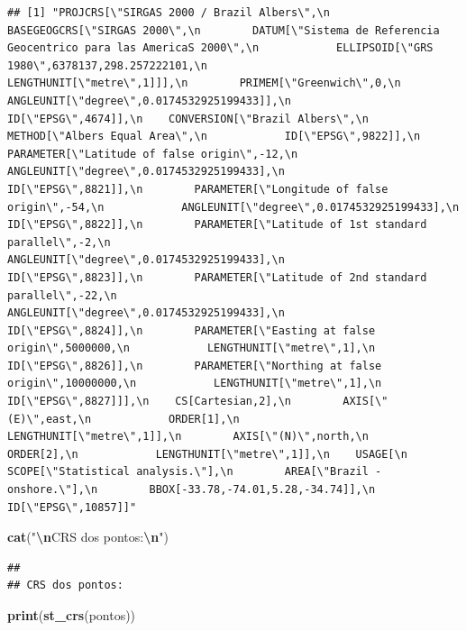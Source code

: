 \documentclass[
]{article}
\newenvironment{Shaded}{\begin{snugshade}}{\end{snugshade}}
\newcommand{\FunctionTok}[1]{\textcolor[rgb]{0.13,0.29,0.53}{\textbf{#1}}}
\newcommand{\NormalTok}[1]{#1}
\newcommand{\SpecialCharTok}[1]{\textcolor[rgb]{0.81,0.36,0.00}{\textbf{#1}}}
\newcommand{\StringTok}[1]{\textcolor[rgb]{0.31,0.60,0.02}{#1}}
\begin{document}
\begin{verbatim}
## [1] "PROJCRS[\"SIRGAS 2000 / Brazil Albers\",\n    BASEGEOGCRS[\"SIRGAS 2000\",\n        DATUM[\"Sistema de Referencia Geocentrico para las AmericaS 2000\",\n            ELLIPSOID[\"GRS 1980\",6378137,298.257222101,\n                LENGTHUNIT[\"metre\",1]]],\n        PRIMEM[\"Greenwich\",0,\n            ANGLEUNIT[\"degree\",0.0174532925199433]],\n        ID[\"EPSG\",4674]],\n    CONVERSION[\"Brazil Albers\",\n        METHOD[\"Albers Equal Area\",\n            ID[\"EPSG\",9822]],\n        PARAMETER[\"Latitude of false origin\",-12,\n            ANGLEUNIT[\"degree\",0.0174532925199433],\n            ID[\"EPSG\",8821]],\n        PARAMETER[\"Longitude of false origin\",-54,\n            ANGLEUNIT[\"degree\",0.0174532925199433],\n            ID[\"EPSG\",8822]],\n        PARAMETER[\"Latitude of 1st standard parallel\",-2,\n            ANGLEUNIT[\"degree\",0.0174532925199433],\n            ID[\"EPSG\",8823]],\n        PARAMETER[\"Latitude of 2nd standard parallel\",-22,\n            ANGLEUNIT[\"degree\",0.0174532925199433],\n            ID[\"EPSG\",8824]],\n        PARAMETER[\"Easting at false origin\",5000000,\n            LENGTHUNIT[\"metre\",1],\n            ID[\"EPSG\",8826]],\n        PARAMETER[\"Northing at false origin\",10000000,\n            LENGTHUNIT[\"metre\",1],\n            ID[\"EPSG\",8827]]],\n    CS[Cartesian,2],\n        AXIS[\"(E)\",east,\n            ORDER[1],\n            LENGTHUNIT[\"metre\",1]],\n        AXIS[\"(N)\",north,\n            ORDER[2],\n            LENGTHUNIT[\"metre\",1]],\n    USAGE[\n        SCOPE[\"Statistical analysis.\"],\n        AREA[\"Brazil - onshore.\"],\n        BBOX[-33.78,-74.01,5.28,-34.74]],\n    ID[\"EPSG\",10857]]"
\end{verbatim}

\begin{Shaded}
\begin{Highlighting}[]
\FunctionTok{cat}\NormalTok{(}\StringTok{"}\SpecialCharTok{\textbackslash{}n}\StringTok{CRS dos pontos:}\SpecialCharTok{\textbackslash{}n}\StringTok{"}\NormalTok{)}
\end{Highlighting}
\end{Shaded}

\begin{verbatim}
## 
## CRS dos pontos:
\end{verbatim}

\begin{Shaded}
\begin{Highlighting}[]
\FunctionTok{print}\NormalTok{(}\FunctionTok{st\_crs}\NormalTok{(pontos))}
\end{Highlighting}
\end{Shaded}
\end{document}
